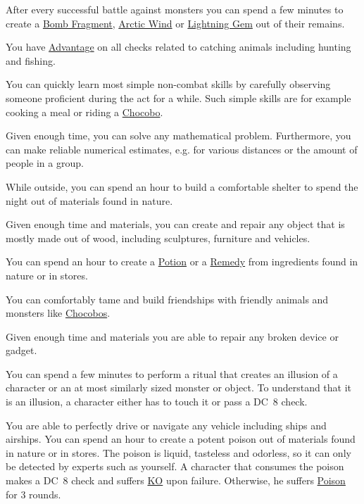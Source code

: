 \begin{description}[leftmargin=*]
	
{
	After every successful battle against monsters you can spend a few minutes to create a \hyperlink{item}{Bomb Fragment}, \hyperlink{item}{Arctic Wind} or \hyperlink{item}{Lightning Gem} out of their remains. 
}

{
	You have \hyperlink{check}{Advantage} on all checks related to catching animals including hunting and fishing.
}

{
	You can quickly learn most simple non-combat skills by carefully observing someone proficient during the act for a while. 
	Such simple skills are for example cooking a meal or riding a \hyperlink{chocobo}{Chocobo}.
}

{
	Given enough time, you can solve any mathematical problem.
	Furthermore, you can make reliable numerical estimates, e.g. for various distances or the amount of people in a group.
}

{
	While outside, you can spend an hour to build a comfortable shelter to spend the night out of materials found in nature.
}	
	
{
	Given enough time and materials, you can create and repair any object that is mostly made out of wood,
	including sculptures, furniture and vehicles.
}

\pagebreak

{
	You can spend an hour to create a \hyperlink{item}{Potion} or a  \hyperlink{item}{Remedy} from ingredients found in nature or in stores.
}

{
	You can comfortably tame and build friendships with friendly animals and monsters like \hyperlink{chocobo}{Chocobos}.
}

{
	Given enough time and materials you are able to repair any broken device or gadget. 
}

{
	You can spend a few minutes to perform a ritual that creates an illusion of a character or an at most similarly sized monster or object.
	To understand that it is an illusion, a character either has to touch it or pass a DC~8 check.
}

{
	You are able to perfectly drive or navigate any vehicle including ships and airships. 
}
{
	You can spend an hour to create a potent poison out of materials found in nature or in stores.
	The poison is liquid, tasteless and odorless, so it can only be detected by experts such as yourself.
	A character that consumes the poison makes a DC~8 check and suffers \hyperlink{status}{KO} upon failure.
	Otherwise, he suffers \hyperlink{status}{Poison} for 3 rounds. 
}


\end{description}
